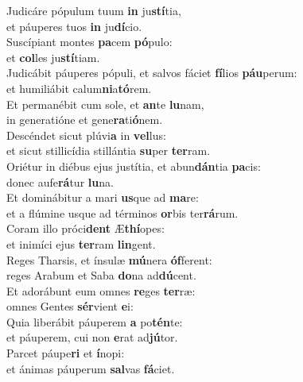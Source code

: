 \evenverse Judicáre pópulum tuum \textbf{in} ju\textbf{stí}tia,~\*\\
\evenverse et páuperes tuos \textbf{in} ju\textbf{dí}cio.\\
\oddverse Suscípiant montes \textbf{pa}cem \textbf{pó}pulo:~\*\\
\oddverse et \textbf{col}les ju\textbf{stí}tiam.\\
\evenverse Judicábit páuperes pópuli, et salvos fáciet \textbf{fí}lios \textbf{páu}perum:~\*\\
\evenverse et humiliábit calum\textbf{ni}a\textbf{tó}rem.\\
\oddverse Et permanébit cum sole, et \textbf{an}te \textbf{lu}nam,~\*\\
\oddverse in generatióne et gene\textbf{ra}ti\textbf{ó}nem.\\
\evenverse Descéndet sicut plúvi\textbf{a} in \textbf{vel}lus:~\*\\
\evenverse et sicut stillicídia stillántia \textbf{su}per \textbf{ter}ram.\\
\oddverse Oriétur in diébus ejus justítia, et abun\textbf{dán}tia \textbf{pa}cis:~\*\\
\oddverse donec aufe\textbf{rá}tur \textbf{lu}na.\\
\evenverse Et dominábitur a mari \textbf{us}que ad \textbf{ma}re:~\*\\
\evenverse et a flúmine usque ad términos \textbf{or}bis ter\textbf{rá}rum.\\
\oddverse Coram illo próci\textbf{dent} Æ\textbf{thí}opes:~\*\\
\oddverse et inimíci ejus \textbf{ter}ram \textbf{lin}gent.\\
\evenverse Reges Tharsis, et ínsulæ \textbf{mú}nera \textbf{óf}ferent:~\*\\
\evenverse reges Arabum et Saba \textbf{do}na ad\textbf{dú}cent.\\
\oddverse Et adorábunt eum omnes \textbf{re}ges \textbf{ter}ræ:~\*\\
\oddverse omnes Gentes \textbf{sér}vient \textbf{e}i:\\
\evenverse Quia liberábit páuperem \textbf{a} po\textbf{tén}te:~\*\\
\evenverse et páuperem, cui non \textbf{e}rat ad\textbf{jú}tor.\\
\oddverse Parcet páupe\textbf{ri} et \textbf{í}nopi:~\*\\
\oddverse et ánimas páuperum \textbf{sal}vas \textbf{fá}ciet.\\
